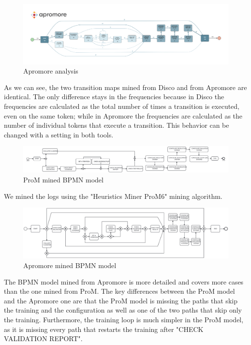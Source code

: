 \begin{figure}[H]
\centering
\includegraphics[width=\textwidth]{figures/apromore_map.pdf}
\caption{Apromore analysis}
\label{fig:apromore_analysis}
\end{figure}

As we can see, the two transition maps mined from Disco and from 
Apromore are identical. The only difference stays in the frequencies
because in Disco the frequencies are calculated as the total number of
times a transition is executed, even on the same token; while in Apromore
the frequencies are calculated as the number of individual tokens that execute a
transition. This behavior can be changed with a setting in both tools.

\begin{figure}[H]
\centering
\includegraphics[width=\textwidth]{figures/prom_mined.pdf}
\caption{ProM mined BPMN model}
\label{fig:prom_mined}
\end{figure}

We mined the logs using the "Heuristics Miner ProM6" mining algorithm.

\begin{figure}[H]
\centering
\includegraphics[width=\textwidth]{figures/apromore_mined.pdf}
\caption{Apromore mined BPMN model}
\label{fig:apromore_mined}
\end{figure}

The BPMN model mined from Apromore is more detailed and
covers more cases than the one mined from ProM.
The key differences between the ProM model and the Apromore one are that the
ProM model is missing the paths that skip
the training and the configuration as well as one of the two paths that skip only
the training. Furthermore, the training loop is much simpler in the ProM model, as
it is missing every path that restarts the training after
"CHECK VALIDATION REPORT".

